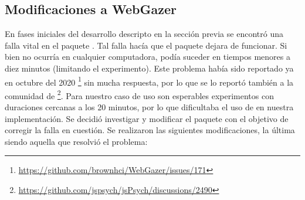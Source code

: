 \subsection{Modificaciones a WebGazer}

En fases iniciales del desarrollo descripto en la sección previa se encontró
una falla vital en el paquete \webgazer.
Tal falla hacía que el paquete dejara de funcionar.
Si bien no ocurría en cualquier computadora, podía suceder en tiempos menores a
diez minutos (limitando el experimento).
Este problema había sido reportado ya en octubre del 2020
\footnote{\url{https://github.com/brownhci/WebGazer/issues/171}} sin mucha
respuesta, por lo que se lo reportó también a la comunidad de \jspsych
\footnote{\url{https://github.com/jspsych/jsPsych/discussions/2490}}.
Para nuestro caso de uso son esperables experimentos con duraciones cercanas a
los 20 minutos, por lo que dificultaba el uso de \webgazer en nuestra
implementación.
Se decidió investigar y modificar el paquete con el objetivo de corregir la
falla en cuestión.
Se realizaron las siguientes modificaciones, la última siendo aquella que
resolvió el problema:
